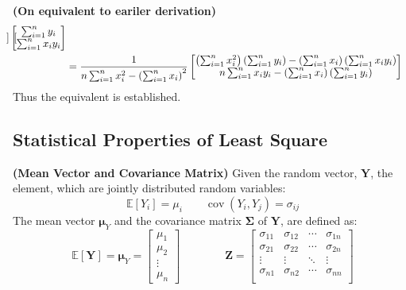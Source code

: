 \begin{remark}{\textbf{(On equivalent to eariler derivation)}}
\begin{equation*}
\begin{aligned}
\begin{bmatrix}
        \end{bmatrix} \begin{bmatrix}
            \sum^n_{i=1}y_i \\ \sum^n_{i=1}x_iy_i
        \end{bmatrix} \\
        &= \frac{1}{n\sum^n_{i=1}x_i^2 - \left( \sum^n_{i=1}x_i \right)^2}\begin{bmatrix}
        \left( \sum^n_{i=1}x_i^2 \right)\left( \sum^n_{i=1}y_i \right) - \left( \sum^n_{i=1} x_i \right)\left( \sum^n_{i=1}x_iy_i \right) \\
        n\sum^n_{i=1}x_iy_i - \left( \sum^n_{i=1}x_i \right)\left( \sum^n_{i=1}y_i \right)
        \end{bmatrix}
    \end{aligned}
    \end{equation*}
    Thus the equivalent is established.
\end{remark}

\subsection{Statistical Properties of Least Square}

\begin{definition}{\textbf{(Mean Vector and Covariance Matrix)}}
    Given the random vector, $\boldsymbol Y$, the element, which are jointly distributed random variables:
    \begin{equation*}
        \mathbb{E}[Y_i] = \mu_i \qquad \operatorname{cov}(Y_i, Y_j) = \sigma_{ij}
    \end{equation*}
    The mean vector $\boldsymbol \mu_Y$ and the covariance matrix $\boldsymbol \Sigma$ of $\boldsymbol Y$, are defined as:
    \begin{equation*}
        \mathbb{E}[\boldsymbol Y] = \boldsymbol \mu_Y = \begin{bmatrix}
            \mu_1 \\ \mu_2 \\ \vdots \\ \mu_n
        \end{bmatrix} \qquad \qquad \boldsymbol Z = \begin{bmatrix}
            \sigma_{11} & \sigma_{12} & \cdots & \sigma_{1n} \\
            \sigma_{21} & \sigma_{22} & \cdots & \sigma_{2n} \\
            \vdots & \vdots & \ddots & \vdots \\
            \sigma_{n1} & \sigma_{n2} & \cdots & \sigma_{nn} \\
        \end{bmatrix}
    \end{equation*}
\end{definition}

